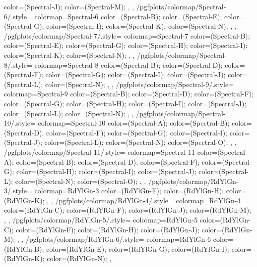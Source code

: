 {{{      color=(Spectral-J);
      color=(Spectral-M);
    },
  },
  /pgfplots/colormap/Spectral-6/.style={
    colormap={Spectral-6}{
      color=(Spectral-B);
      color=(Spectral-E);
      color=(Spectral-G);
      color=(Spectral-I);
      color=(Spectral-K);
      color=(Spectral-N);
    },
  },
  /pgfplots/colormap/Spectral-7/.style={
    colormap={Spectral-7}{
      color=(Spectral-B);
      color=(Spectral-E);
      color=(Spectral-G);
      color=(Spectral-H);
      color=(Spectral-I);
      color=(Spectral-K);
      color=(Spectral-N);
    },
  },
  /pgfplots/colormap/Spectral-8/.style={
    colormap={Spectral-8}{
      color=(Spectral-B);
      color=(Spectral-D);
      color=(Spectral-F);
      color=(Spectral-G);
      color=(Spectral-I);
      color=(Spectral-J);
      color=(Spectral-L);
      color=(Spectral-N);
    },
  },
  /pgfplots/colormap/Spectral-9/.style={
    colormap={Spectral-9}{
      color=(Spectral-B);
      color=(Spectral-D);
      color=(Spectral-F);
      color=(Spectral-G);
      color=(Spectral-H);
      color=(Spectral-I);
      color=(Spectral-J);
      color=(Spectral-L);
      color=(Spectral-N);
    },
  },
  /pgfplots/colormap/Spectral-10/.style={
    colormap={Spectral-10}{
      color=(Spectral-A);
      color=(Spectral-B);
      color=(Spectral-D);
      color=(Spectral-F);
      color=(Spectral-G);
      color=(Spectral-I);
      color=(Spectral-J);
      color=(Spectral-L);
      color=(Spectral-N);
      color=(Spectral-O);
    },
  },
  /pgfplots/colormap/Spectral-11/.style={
    colormap={Spectral-11}{
      color=(Spectral-A);
      color=(Spectral-B);
      color=(Spectral-D);
      color=(Spectral-F);
      color=(Spectral-G);
      color=(Spectral-H);
      color=(Spectral-I);
      color=(Spectral-J);
      color=(Spectral-L);
      color=(Spectral-N);
      color=(Spectral-O);
    },
  },
  /pgfplots/colormap/RdYlGn-3/.style={
    colormap={RdYlGn-3}{
      color=(RdYlGn-E);
      color=(RdYlGn-H);
      color=(RdYlGn-K);
    },
  },
  /pgfplots/colormap/RdYlGn-4/.style={
    colormap={RdYlGn-4}{
      color=(RdYlGn-C);
      color=(RdYlGn-F);
      color=(RdYlGn-J);
      color=(RdYlGn-M);
    },
  },
  /pgfplots/colormap/RdYlGn-5/.style={
    colormap={RdYlGn-5}{
      color=(RdYlGn-C);
      color=(RdYlGn-F);
      color=(RdYlGn-H);
      color=(RdYlGn-J);
      color=(RdYlGn-M);
    },
  },
  /pgfplots/colormap/RdYlGn-6/.style={
    colormap={RdYlGn-6}{
      color=(RdYlGn-B);
      color=(RdYlGn-E);
      color=(RdYlGn-G);
      color=(RdYlGn-I);
      color=(RdYlGn-K);
      color=(RdYlGn-N);
    },
}}
